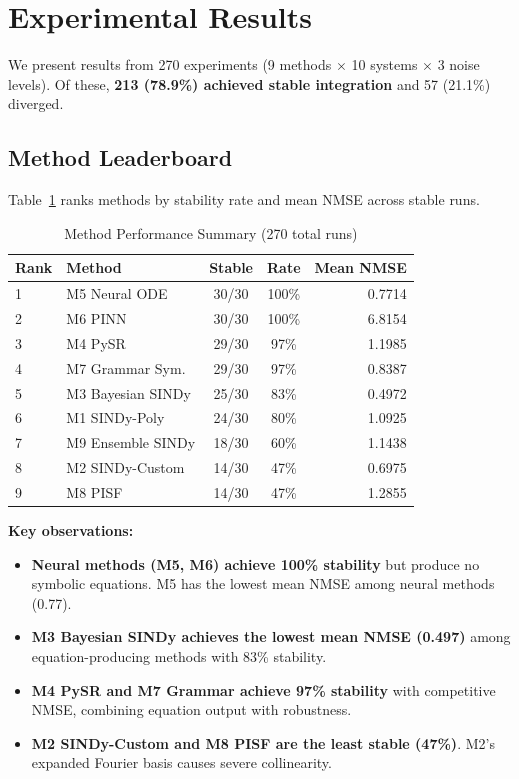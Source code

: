 \section{Experimental Results}
\label{sec:results}

We present results from 270 experiments (9 methods $\times$ 10 systems $\times$ 3 noise levels). Of these, \textbf{213 (78.9\%) achieved stable integration} and 57 (21.1\%) diverged.

\subsection{Method Leaderboard}

Table~\ref{tab:leaderboard} ranks methods by stability rate and mean NMSE across stable runs.

\begin{table}[!ht]
\centering
\caption{Method Performance Summary (270 total runs)}
\label{tab:leaderboard}
\begin{tabular}{@{}llccr@{}}
\toprule
\textbf{Rank} & \textbf{Method} & \textbf{Stable} & \textbf{Rate} & \textbf{Mean NMSE} \\
\midrule
1 & M5 Neural ODE & 30/30 & 100\% & 0.7714 \\
2 & M6 PINN & 30/30 & 100\% & 6.8154 \\
3 & M4 PySR & 29/30 & 97\% & 1.1985 \\
4 & M7 Grammar Sym. & 29/30 & 97\% & 0.8387 \\
5 & M3 Bayesian SINDy & 25/30 & 83\% & 0.4972 \\
6 & M1 SINDy-Poly & 24/30 & 80\% & 1.0925 \\
7 & M9 Ensemble SINDy & 18/30 & 60\% & 1.1438 \\
8 & M2 SINDy-Custom & 14/30 & 47\% & 0.6975 \\
9 & M8 PISF & 14/30 & 47\% & 1.2855 \\
\bottomrule
\end{tabular}
\end{table}

\textbf{Key observations:}
\begin{itemize}
    \item \textbf{Neural methods (M5, M6) achieve 100\% stability} but produce no symbolic equations. M5 has the lowest mean NMSE among neural methods (0.77).
    \item \textbf{M3 Bayesian SINDy achieves the lowest mean NMSE (0.497)} among equation-producing methods with 83\% stability.
    \item \textbf{M4 PySR and M7 Grammar achieve 97\% stability} with competitive NMSE, combining equation output with robustness.
    \item \textbf{M2 SINDy-Custom and M8 PISF are the least stable (47\%)}. M2's expanded Fourier basis causes severe collinearity.
\end{itemize}

